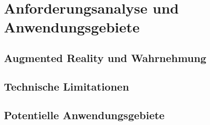 %
\chapter{Anforderungsanalyse und Anwendungsgebiete}
\label{sec:requirements}

\section{Augmented Reality und Wahrnehmung}

\section{Technische Limitationen}

\section{Potentielle Anwendungsgebiete}